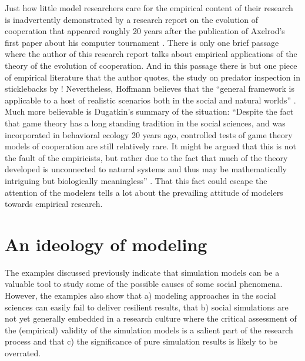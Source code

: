 \documentclass[12pt, english, a4paper]{article}
\begin{document}
Just how little model researchers care for the empirical content of
their research is inadvertently demonstrated by a research report on
the evolution of cooperation that appeared roughly 20 years after
the publication of Axelrod’s first paper about his computer tournament
\citep{hoffmann:2000}. There is only one brief passage where the
author of this research report talks about empirical applications of
the theory of the evolution of cooperation. And in this passage there
is but one piece of empirical literature that the author quotes, the
study on predator inspection in sticklebacks by \citet{milinski:1987}!
Nevertheless, Hoffmann believes that the “general framework is
applicable to a host of realistic scenarios both in the social and
natural worlds” \citep[4.3]{hoffmann:2000}. Much more believable is
Dugatkin’s summary of the situation: “Despite the fact that game
theory has a long standing tradition in the social sciences, and was
incorporated in behavioral ecology 20 years ago, controlled tests of
game theory models of cooperation are still relatively rare. It might
be argued that this is not the fault of the empiricists, but rather
due to the fact that much of the theory developed is unconnected to
natural systems and thus may be mathematically intriguing but
biologically meaningless” \citep[57]{dugatkin:1998a}. That this fact
could escape the attention of the modelers tells a lot about the
prevailing attitude of modelers towards empirical research.


\section{An ideology of modeling}

The examples discussed previously indicate that simulation models can
be a valuable tool to study some of the possible causes of some social
phenomena. However, the examples also show that a) modeling approaches
in the social sciences can easily fail to deliver resilient results,
that b) social simulations are not yet generally embedded in a
research culture where the critical assessment of the (empirical)
validity of the simulation models is a salient part of the research
process and that c) the significance of pure simulation results is
likely to be overrated.
\end{document}
